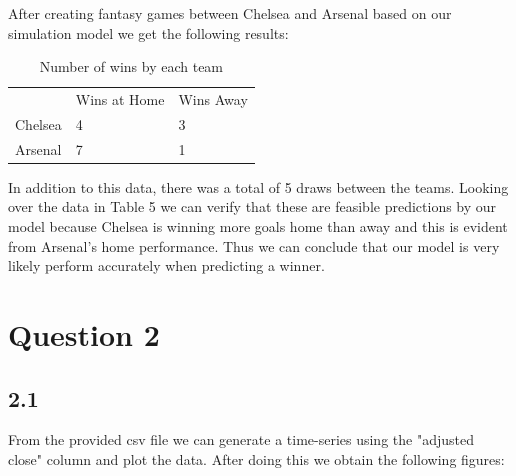 \documentclass[12pt]{report}
\begin{document}
\vspace{0.3cm}
\noindent
After creating fantasy games between Chelsea and Arsenal based on our simulation model we get the following results:

\begin{table}[ht]
\centering
\caption{Number of wins by each team}
\label{t6}
\begin{tabular}{lll}
        & Wins at Home & Wins Away \\
Chelsea & 4            & 3         \\
Arsenal & 7            & 1        
\end{tabular}
\end{table}

\noindent
In addition to this data, there was a total of 5 draws between the teams. Looking over the data in Table 5 we can verify that these are feasible predictions by our model because Chelsea is winning more goals home than away and this is evident from Arsenal's home performance. Thus we can conclude that our model is very likely perform accurately when predicting a winner.  

\newpage
\section{Question 2}
\subsection{2.1}

From the provided csv file we can generate a time-series using the "adjusted close" column and plot the data. After doing this we obtain the following figures:
\end{document}
